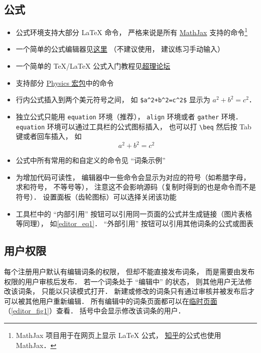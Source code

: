 \subsection{公式}
\begin{itemize}
\item 公式环境支持大部分 LaTeX 命令， 严格来说是所有 \href{https://www.mathjax.org/}{MathJax} 支持的命令\footnote{MathJax 项目用于在网页上显示 LaTeX 公式， \href{https://www.zhihu.com/}{知乎}的公式也使用 MathJax．}
\item 一个简单的公式编辑器见\href{https://www.codecogs.com/latex/eqneditor.php}{这里} （不建议使用， 建议练习手动输入）
\item 一个简单的 TeX/LaTeX 公式入门教程见\href{https://chaoli.club/index.php/211}{超理论坛}
\item 支持部分 \href{http://mirrors.ibiblio.org/CTAN/macros/latex/contrib/physics/physics.pdf}{Physics 宏包}中的命令
\item 行内公式插入到两个美元符号之间， 如 \verb|$a^2+b^2=c^2$| 显示为 $a^2 + b^2 = c^2$．
\item 独立公式只能用 \verb|equation| 环境（推荐）， \verb|align| 环境或者 \verb|gather| 环境． \verb|equation| 环境可以通过工具栏的公式图标插入， 也可以打 \verb|\beq| 然后按 Tab 键或者回车插入， 如
\begin{equation}\label{editor_eq1}
a^2 + b^2 = c^2
\end{equation}
\item 公式中所有常用的和自定义的命令见 “词条示例”
\item 为增加代码可读性， 编辑器中一些命令会显示为对应的符号（如希腊字母， 求和符号， 不等号等）， 注意这不会影响源码（复制时得到的也是命令而不是符号）． 设置面板（齿轮图标）可以选择关闭该功能
\item 工具栏中的 “内部引用” 按钮可以引用同一页面的公式并生成链接（图片表格等同理）， 如\autoref{editor_eq1}． “外部引用” 按钮可以引用其他词条的公式或图表
\end{itemize}

\subsection{用户权限}
每个注册用户默认有编辑词条的权限， 但却不能直接发布词条， 而是需要由发布权限的用户审核后发布． 若一个词条处于 “编辑中” 的状态， 则其他用户无法修改该词条， 只能以只读模式打开． 新建或修改的词条只有通过审核并被发布后才可以被其他用户重新编辑． 所有编辑中的词条页面都可以在\href{http://wuli.wiki/changed/changed.html}{临时页面}（\autoref{editor_fig1}）查看． 括号中会显示修改该词条的用户．

